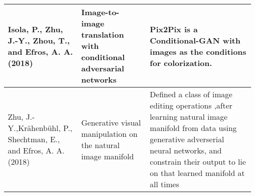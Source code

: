\documentclass[12pt]{article}
\begin{document}
\begin{tabularx}{\textwidth}{| X | X | X | }
Isola, P., Zhu, J.-Y., Zhou, T., and Efros, A. A. (2018) & Image-to-image translation with conditional adversarial networks &  Pix2Pix is a Conditional-GAN with images as the conditions for colorization.\\ \hline


Zhu, J.-Y.,Krähenbühl, P., Shechtman, E., and Efros, A. A. (2018) & Generative visual manipulation on the natural image manifold & Defined a class of image editing operations ,after learning natural image manifold from data using generative adverserial neural networks, and constrain their output to lie on that learned manifold at all times \\ \hline


\end{tabularx}
\end{document}
